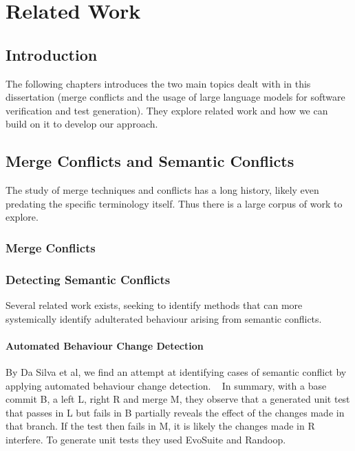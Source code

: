 \chapter{Related Work} \label{chap:sota}

\section{Introduction}

 The following chapters introduces the two main topics dealt with in this dissertation (merge conflicts and the usage of large language models for software verification and test generation). They explore related work and how we can build on it to develop our approach.

\section{Merge Conflicts and Semantic Conflicts}

The study of merge techniques and conflicts has a long history, likely even predating the specific terminology itself. Thus there is a large corpus of work to explore.

\subsection{Merge Conflicts}

\subsection{Detecting Semantic Conflicts}

Several related work exists, seeking to identify methods that can more systemically identify adulterated behaviour arising from semantic conflicts.

\subsubsection{Automated Behaviour Change Detection}

By Da Silva et al, we find an attempt at identifying cases of semantic conflict by applying automated behaviour change detection. ~\citep{kn:leuson} In summary, with a base commit B, a left L, right R and merge M, they observe that a generated unit test that passes in L but fails in B partially reveals the effect of the changes made in that branch. If the test then fails in M, it is likely the changes made in R interfere. To generate unit tests they used EvoSuite and Randoop. ~\citep{kn:randoop}
~\citep{kn:evosuite}

